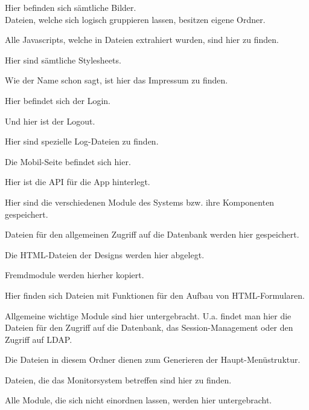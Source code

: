 \begin{description}[style=nextline]
\begin{description}[style=nextline]
				\item[./images/]
					Hier befinden sich sämtliche Bilder.\\
					Dateien, welche sich logisch gruppieren lassen, besitzen eigene Ordner.
				\item[./scripts/]
					Alle Javascripts, welche in Dateien extrahiert wurden, sind hier zu finden.
				\item[./styles/]
					Hier sind sämtliche Stylesheets.	
			\end{description}
		\item[/impressum/]
			Wie der Name schon sagt, ist hier das Impressum zu finden.
		\item[/login/]
			Hier befindet sich der Login.
		\item[/logout/]
			Und hier ist der Logout.
		\item[/logs/]
			Hier sind spezielle Log-Dateien zu finden.
		\item[/mobile/]
			Die Mobil-Seite befindet sich hier.
			\begin{description}[style=nextline]
				\item[./api/]
					Hier ist die API für die App hinterlegt.
			\end{description}
		\item[/modules/]
			Hier sind die verschiedenen Module des Systems bzw. ihre Komponenten  gespeichert.
			\begin{description}[style=nextline]
				\item[./datebase/]
					Dateien für den allgemeinen Zugriff auf die Datenbank werden hier gespeichert.
				\item[./design/]
					Die HTML-Dateien der Designs werden hier abgelegt.
				\item[./external/]
					Fremdmodule werden hierher kopiert.
				\item[./form/]
					Hier finden sich Dateien mit Funktionen für den Aufbau von HTML-Formularen.
				\item[./general/]
					Allgemeine wichtige Module sind hier untergebracht. U.a. findet man hier die Dateien für den Zugriff auf die Datenbank, das Session-Management oder den Zugriff auf LDAP.
				\item[./menu/]
					Die Dateien in diesem Ordner dienen zum Generieren der Haupt-Menüstruktur.
				\item[./monitors/]
					Dateien, die das Monitorsystem betreffen sind hier zu finden.
				\item[./other/]
					Alle Module, die sich nicht einordnen lassen, werden hier untergebracht.

\end{description}
\end{description}
